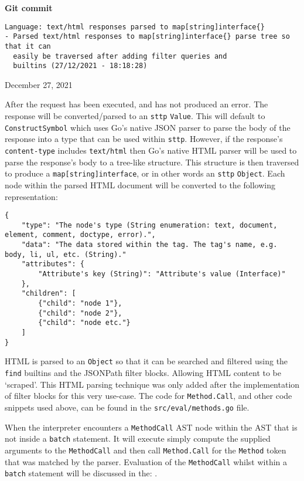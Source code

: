 \begin{center}
    \textbf{Git commit}
    \begin{verbatim}
Language: text/html responses parsed to map[string]interface{}
- Parsed text/html responses to map[string]interface{} parse tree so that it can
  easily be traversed after adding filter queries and
  builtins (27/12/2021 - 18:18:28)
    \end{verbatim}
    \vspace{-1em}
    \tiny{December 27, 2021}
\end{center}

After the request has been executed, and has not produced an error. The response will be converted/parsed to an \verb|sttp| \verb|Value|. This will default to \verb|ConstructSymbol| which uses Go's native JSON parser to parse the body of the response into a type that can be used within \verb|sttp|. However, if the response's \verb|content-type| includes \verb|text/html| then Go's native HTML parser will be used to parse the response's body to a tree-like structure. This structure is then traversed to produce a \texttt{map[string]interface{}}, or in other words an \verb|sttp| \verb|Object|. Each node within the parsed HTML document will be converted to the following representation:

\begin{verbatim}
{
    "type": "The node's type (String enumeration: text, document, element, comment, doctype, error).",
    "data": "The data stored within the tag. The tag's name, e.g. body, li, ul, etc. (String)."
    "attributes": {
        "Attribute's key (String)": "Attribute's value (Interface)"
    },
    "children": [
        {"child": "node 1"},
        {"child": "node 2"},
        {"child": "node etc."}
    ]
}
\end{verbatim}

HTML is parsed to an \verb|Object| so that it can be searched and filtered using the \verb|find| builtins and the JSONPath filter blocks. Allowing HTML content to be `scraped'. This HTML parsing technique was only added after the implementation of filter blocks for this very use-case. The code for \verb|Method.Call|, and other code snippets used above, can be found in the \verb|src/eval/methods.go| file.

When the interpreter encounters a \verb|MethodCall| AST node within the AST that is not inside a \verb|batch| statement. It will execute simply compute the supplied arguments to the \verb|MethodCall| and then call \verb|Method.Call| for the \verb|Method| token that was matched by the parser. Evaluation of the \verb|MethodCall| whilst within a \verb|batch| statement will be discussed in the: .
